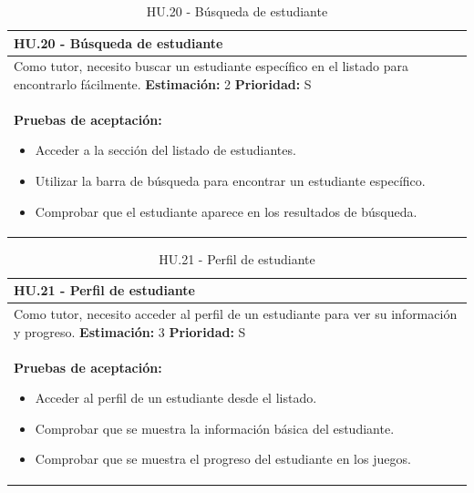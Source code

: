 \begin{table}[H]
\centering
\begin{tabularx}{\textwidth}{|X|}
\hline
\textbf{HU.20 - Búsqueda de estudiante}  \\
\hline
Como tutor, necesito buscar un estudiante específico en el listado para encontrarlo fácilmente.
\clearpage
\textbf{Estimación: }2
\clearpage
\textbf{Prioridad: }S
\\
\hline
\textbf{Pruebas de aceptación:}
\begin{itemize}
    \item Acceder a la sección del listado de estudiantes.
    \item Utilizar la barra de búsqueda para encontrar un estudiante específico.
    \item Comprobar que el estudiante aparece en los resultados de búsqueda.
\end{itemize}
\\
\hline
\end{tabularx}
\caption{HU.20 - Búsqueda de estudiante}
\end{table}

\begin{table}[H]
\centering
\begin{tabularx}{\textwidth}{|X|}
\hline
\textbf{HU.21 - Perfil de estudiante}  \\
\hline
Como tutor, necesito acceder al perfil de un estudiante para ver su información y progreso.
\clearpage
\textbf{Estimación: }3
\clearpage
\textbf{Prioridad: }S
\\
\hline
\textbf{Pruebas de aceptación:}
\begin{itemize}
    \item Acceder al perfil de un estudiante desde el listado.
    \item Comprobar que se muestra la información básica del estudiante.
    \item Comprobar que se muestra el progreso del estudiante en los juegos.
\end{itemize}
\\
\hline
\end{tabularx}
\caption{HU.21 - Perfil de estudiante}
\end{table}

